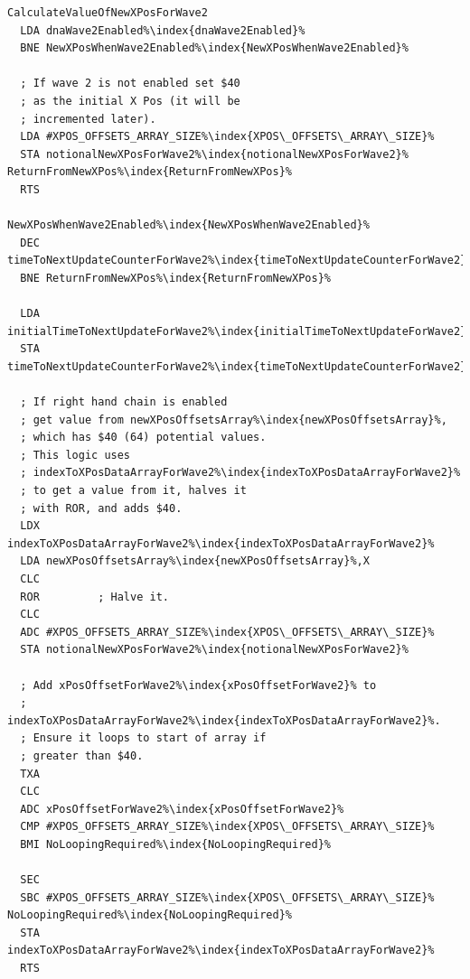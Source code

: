 \begin{minipage}[b]{0.55\linewidth}
\centering
\begin{lstlisting}[escapechar=\%,basicstyle=\tiny, caption=Calculate a notional X Pos value for Wave 2. This routine\index{routine} is called by the one on the
right\, its return value is \icode{notionalNewXPosForWave2\index{notionalNewXPosForWave2}}. ]
CalculateValueOfNewXPosForWave2
  LDA dnaWave2Enabled%\index{dnaWave2Enabled}%
  BNE NewXPosWhenWave2Enabled%\index{NewXPosWhenWave2Enabled}%

  ; If wave 2 is not enabled set $40
  ; as the initial X Pos (it will be
  ; incremented later).
  LDA #XPOS_OFFSETS_ARRAY_SIZE%\index{XPOS\_OFFSETS\_ARRAY\_SIZE}%
  STA notionalNewXPosForWave2%\index{notionalNewXPosForWave2}%
ReturnFromNewXPos%\index{ReturnFromNewXPos}%   
  RTS

NewXPosWhenWave2Enabled%\index{NewXPosWhenWave2Enabled}%   
  DEC timeToNextUpdateCounterForWave2%\index{timeToNextUpdateCounterForWave2}%
  BNE ReturnFromNewXPos%\index{ReturnFromNewXPos}%

  LDA initialTimeToNextUpdateForWave2%\index{initialTimeToNextUpdateForWave2}%
  STA timeToNextUpdateCounterForWave2%\index{timeToNextUpdateCounterForWave2}%

  ; If right hand chain is enabled
  ; get value from newXPosOffsetsArray%\index{newXPosOffsetsArray}%,
  ; which has $40 (64) potential values. 
  ; This logic uses 
  ; indexToXPosDataArrayForWave2%\index{indexToXPosDataArrayForWave2}% 
  ; to get a value from it, halves it
  ; with ROR, and adds $40.
  LDX indexToXPosDataArrayForWave2%\index{indexToXPosDataArrayForWave2}%
  LDA newXPosOffsetsArray%\index{newXPosOffsetsArray}%,X
  CLC
  ROR         ; Halve it.
  CLC
  ADC #XPOS_OFFSETS_ARRAY_SIZE%\index{XPOS\_OFFSETS\_ARRAY\_SIZE}%
  STA notionalNewXPosForWave2%\index{notionalNewXPosForWave2}%

  ; Add xPosOffsetForWave2%\index{xPosOffsetForWave2}% to
  ; indexToXPosDataArrayForWave2%\index{indexToXPosDataArrayForWave2}%.
  ; Ensure it loops to start of array if
  ; greater than $40. 
  TXA
  CLC
  ADC xPosOffsetForWave2%\index{xPosOffsetForWave2}%
  CMP #XPOS_OFFSETS_ARRAY_SIZE%\index{XPOS\_OFFSETS\_ARRAY\_SIZE}%
  BMI NoLoopingRequired%\index{NoLoopingRequired}%

  SEC
  SBC #XPOS_OFFSETS_ARRAY_SIZE%\index{XPOS\_OFFSETS\_ARRAY\_SIZE}%
NoLoopingRequired%\index{NoLoopingRequired}%   
  STA indexToXPosDataArrayForWave2%\index{indexToXPosDataArrayForWave2}%
  RTS
\end{lstlisting}
\end{minipage}
